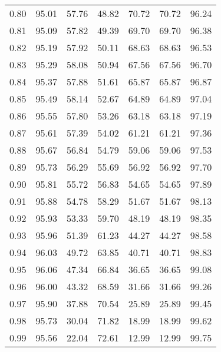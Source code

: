 \begin{tabular}{|c|c|c|c|c|c|c|}
      0.80 &     95.01 &     57.76 &      48.82 &   70.72 &      70.72 &         96.24 \\
      0.81 &     95.09 &     57.82 &      49.39 &   69.70 &      69.70 &         96.38 \\
      0.82 &     95.19 &     57.92 &      50.11 &   68.63 &      68.63 &         96.53 \\
      0.83 &     95.29 &     58.08 &      50.94 &   67.56 &      67.56 &         96.70 \\
      0.84 &     95.37 &     57.88 &      51.61 &   65.87 &      65.87 &         96.87 \\
      0.85 &     95.49 &     58.14 &      52.67 &   64.89 &      64.89 &         97.04 \\
      0.86 &     95.55 &     57.80 &      53.26 &   63.18 &      63.18 &         97.19 \\
      0.87 &     95.61 &     57.39 &      54.02 &   61.21 &      61.21 &         97.36 \\
      0.88 &     95.67 &     56.84 &      54.79 &   59.06 &      59.06 &         97.53 \\
      0.89 &     95.73 &     56.29 &      55.69 &   56.92 &      56.92 &         97.70 \\
      0.90 &     95.81 &     55.72 &      56.83 &   54.65 &      54.65 &         97.89 \\
      0.91 &     95.88 &     54.78 &      58.29 &   51.67 &      51.67 &         98.13 \\
      0.92 &     95.93 &     53.33 &      59.70 &   48.19 &      48.19 &         98.35 \\
      0.93 &     95.96 &     51.39 &      61.23 &   44.27 &      44.27 &         98.58 \\
      0.94 &     96.03 &     49.72 &      63.85 &   40.71 &      40.71 &         98.83 \\
      0.95 &     96.06 &     47.34 &      66.84 &   36.65 &      36.65 &         99.08 \\
      0.96 &     96.00 &     43.32 &      68.59 &   31.66 &      31.66 &         99.26 \\
      0.97 &     95.90 &     37.88 &      70.54 &   25.89 &      25.89 &         99.45 \\
      0.98 &     95.73 &     30.04 &      71.82 &   18.99 &      18.99 &         99.62 \\
      0.99 &     95.56 &     22.04 &      72.61 &   12.99 &      12.99 &         99.75 \\
\bottomrule
\end{tabular}
